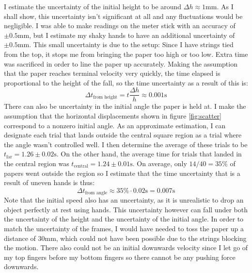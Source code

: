 \documentclass[%
 reprint,
 amsmath,amssymb,
 aps,
]{revtex4-2}
\begin{document}
I estimate the uncertainty of the initial height to be around $\Delta h \approx 1 \si{\milli\meter}$. As I shall show, this uncertainty isn't significant at all and any fluctuations would be negligible. I was able to make readings on the meter stick with an accuracy of $\pm 0.5 \si{\milli\meter}$, but I estimate my shaky hands to have an additional uncertainty of $\pm 0.5 \si{\milli\meter}$. This small uncertainty is due to the setup: Since I have strings tied from the top, it stops me from bringing the paper too high or too low. Extra time was sacrificed in order to line the paper up accurately. Making the assumption that the paper reaches terminal velocity very quickly, the time elapsed is proportional to the height of the fall, so the time uncertainty as a result of this is:
\begin{equation}
    \Delta t_\text{from height} = t\frac{\Delta h}{h} \approx 0.001 \si{\second}
    \label{eq:}
\end{equation}
There can also be uncertainty in the initial angle the paper is held at. I make the assumption that the horizontal displacements shown in figure \ref{fig:scatter} correspond to a nonzero initial angle. As an approximate estimation, I can designate each trial that lands outside the central square region as a trial where the angle wasn't controlled well. I then determine the average of these trials to be $t_\text{far}=1.26 \pm 0.02\si{\second}$. On the other hand, the average time for trials that landed in the central region was $t_\text{central}=1.24 \pm 0.01 \si{\second}$. On average, only $14/40=35\%$ of papers went outside the region so I estimate that the time uncertainty that is a result of uneven hands is thus:
\begin{equation}
    \Delta t_\text{from angle} \approx 35\% \cdot 0.02\si{\second} = 0.007 \si{\second}
    \label{eq:angle uncertainty}
\end{equation}
Note that the initial speed also has an uncertainty, as it is unrealistic to drop an object perfectly at rest using hands. This uncertainty however can fall under both the uncertainty of the height and the uncertainty of the initial angle. In order to match the uncertainty of the frames, I would have needed to toss the paper up a distance of $30\si{\milli\meter}$, which could not have been possible due to the strings blocking the motion. There also could not be an initial downwards velocity since I let go of my top fingers before my bottom fingers so there cannot be any pushing force downwards.
\end{document}
